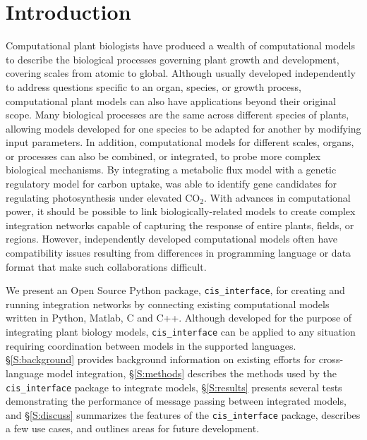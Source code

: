 \documentclass[journal]{IEEEtran}
\newcommand{\cis}{{\tt cis\_interface}{}}
\begin{document}
\section{Introduction}\label{S:intro}
%
Computational plant biologists have produced a wealth of computational models to describe the biological processes governing plant growth and development, covering scales from atomic to global. Although usually developed independently to address questions specific to an organ, species, or growth process, computational plant models can also have applications beyond their original scope. Many biological processes are the same across different species of plants, allowing models developed for one species to be adapted for another by modifying input parameters. In addition, computational models for different scales, organs, or processes can also be combined, or integrated, to probe more complex biological mechanisms. By integrating a metabolic flux model with a genetic regulatory model for carbon uptake, 
%
\ifieee
	\citep{integration_prep} 
\else
	\citet{integration_prep} 
\fi
%
was able to identify gene candidates for regulating photosynthesis under elevated CO$_{2}$. With advances in computational power, it should be possible to link biologically-related models to create complex integration networks capable of capturing the response of entire plants, fields, or regions. However, independently developed computational models often have compatibility issues resulting from differences in programming language or data format that make such collaborations difficult. 

We present an Open Source Python package, {\cis}, for creating and running integration networks by connecting existing computational models written in Python, Matlab, C and C++. Although developed for the purpose of integrating plant biology models, {\cis} can be applied to any situation requiring coordination between models in the supported languages. \S\ref{S:background} provides background information on existing efforts for cross-language model integration, \S\ref{S:methods} describes the methods used by the {\cis} package to integrate models, \S\ref{S:results} presents several tests demonstrating the performance of message passing between integrated models, and \S\ref{S:discuss} summarizes the features of the {\cis} package, describes a few use cases, and outlines areas for future development.

\end{document}
